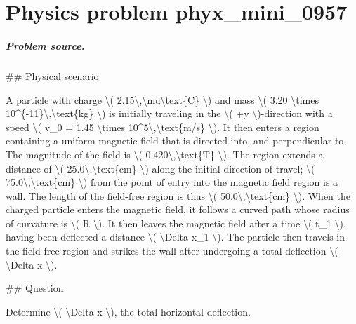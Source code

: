 
\chapter{Physics problem phyx\_mini\_0957}
\label{ch:PhyXMiniProblems_problem_phyx_mini_0957}

\paragraph{Problem source.}
\#\# Physical scenario

A particle with charge \textbackslash{}( 2.15\textbackslash{},\textbackslash{}mu\textbackslash{}text\{C\} \textbackslash{}) and mass \textbackslash{}( 3.20 \textbackslash{}times 10\textasciicircum{}\{-11\}\textbackslash{},\textbackslash{}text\{kg\} \textbackslash{}) is initially traveling in the \textbackslash{}( +y \textbackslash{})-direction with a speed \textbackslash{}( v\_0 = 1.45 \textbackslash{}times 10\textasciicircum{}5\textbackslash{},\textbackslash{}text\{m/s\} \textbackslash{}). It then enters a region containing a uniform magnetic field that is directed into, and perpendicular to. The magnitude of the field is \textbackslash{}( 0.420\textbackslash{},\textbackslash{}text\{T\} \textbackslash{}). The region extends a distance of \textbackslash{}( 25.0\textbackslash{},\textbackslash{}text\{cm\} \textbackslash{}) along the initial direction of travel; \textbackslash{}( 75.0\textbackslash{},\textbackslash{}text\{cm\} \textbackslash{}) from the point of entry into the magnetic field region is a wall. The length of the field-free region is thus \textbackslash{}( 50.0\textbackslash{},\textbackslash{}text\{cm\} \textbackslash{}). When the charged particle enters the magnetic field, it follows a curved path whose radius of curvature is \textbackslash{}( R \textbackslash{}). It then leaves the magnetic field after a time \textbackslash{}( t\_1 \textbackslash{}), having been deflected a distance \textbackslash{}( \textbackslash{}Delta x\_1 \textbackslash{}). The particle then travels in the field-free region and strikes the wall after undergoing a total deflection \textbackslash{}( \textbackslash{}Delta x \textbackslash{}).

\#\# Question

Determine \textbackslash{}( \textbackslash{}Delta x \textbackslash{}), the total horizontal deflection.

